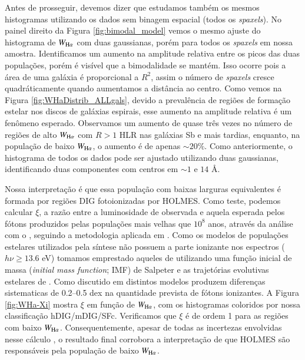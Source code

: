 
Antes de prosseguir, devemos dizer que estudamos também os mesmos histogramas utilizando os dados sem binagem espacial (todos os {\em spaxels}). No painel direito da Figura \ref{fig:bimodal_model} vemos o mesmo ajuste do histograma de $W_{\Ha}$ com duas gaussianas, porém para todos os {\em spaxels} em nossa amostra. Identificamos um aumento na amplitude relativa entre os picos das duas populações, porém é visível que a bimodalidade se mantém. Isso ocorre pois a área de uma galáxia é proporcional a $R^2$, assim o número de {\em spaxels} cresce quadráticamente quando aumentamos a distância ao centro. Como vemos na Figura \ref{fig:WHaDistrib_ALLgals}, devido a prevalência de regiões de formação estelar nos discos de galáxias espirais, esse aumento na amplitude relativa é um fenômeno esperado. Observamos um aumento de quase três vezes no número de regiões de alto $W_{\Ha}$ com $R > 1$ HLR nas galáxias Sb e mais tardias, enquanto, na população de baixo $W_{\Ha}$, o aumento é de apenas $\sim 20\%$. Como anteriormente, o histograma de todos os dados pode ser ajustado utilizando duas gaussianas, identificando duas componentes com centros em $\sim 1$ e $14$ \AA.


Nossa interpretação é que essa população com baixas larguras equivalentes é formada por regiões DIG fotoionizadas por HOLMES. Como teste, podemos calcular $\xi$, a razão entre a luminosidade de \Ha observada e aquela esperada pelos fótons produzidos pelas populações mais velhas que $10^8$ anos, através da análise com o \starlight, seguindo a metodologia aplicada em \citet{CidFernandes.etal.2011a}. Como os modelos de populações estelares utilizados pela síntese \citep{Gonzalezdelgado2005, Vazdekis2010} não possuem a parte ionizante nos espectros ($h\nu \ge 13.6$ eV) tomamos emprestado aqueles de \citet{Bruzual.Charlot.2003} utilizando uma função inicial de massa ({\em initial mass function}; IMF) de Salpeter e as trajetórias evolutivas estelares de \citet{Girardi2000}. Como discutido em \citet{CidFernandes.etal.2011a} distintos modelos produzem diferenças sistematicas de 0.2--0.5 dex na quantidade  prevista de fótons ionizantes. A Figura \ref{fig:WHa-Xi} mostra $\xi$ em função de $W_{\Ha}$, com os histogramas coloridos por nossa classificação hDIG/mDIG/SFc. Verificamos que $\xi$ é de ordem 1 para as regiões com baixo $W_{\Ha}$. Consequentemente, apesar de todas as incertezas envolvidas nesse cálculo \citep{CidFernandes.etal.2011a, Belfiore.etal.2016, Morisset.etal.2016}, o resultado final corrobora a interpretação de que HOLMES são responsáveis pela população de baixo $W_{\Ha}$.


